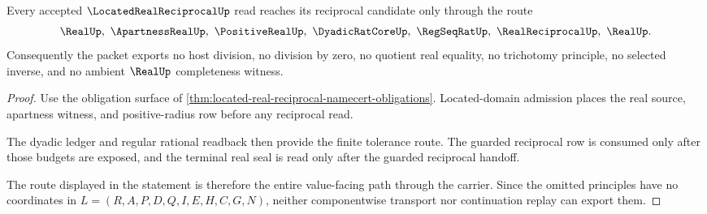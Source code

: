 \begin{theorem}
\label{thm:located-real-reciprocal-nonescape}
Every accepted $\LocatedRealReciprocalUp$ read reaches its reciprocal candidate only through the route
$$
\RealUp,\ \ApartnessRealUp,\ \PositiveRealUp,\ \DyadicRatCoreUp,\ \RegSeqRatUp,\ \RealReciprocalUp,\ \RealUp .
$$
Consequently the packet exports no host division, no division by zero, no quotient real equality, no trichotomy principle, no selected inverse, and no ambient $\RealUp$ completeness witness.
\end{theorem}
\begin{proof}
Use the obligation surface of \autoref{thm:located-real-reciprocal-namecert-obligations}. Located-domain admission places the real source, apartness witness, and positive-radius row before any reciprocal read.

The dyadic ledger and regular rational readback then provide the finite tolerance route. The guarded reciprocal row is consumed only after those budgets are exposed, and the terminal real seal is read only after the guarded reciprocal handoff.

The route displayed in the statement is therefore the entire value-facing path through the carrier. Since the omitted principles have no coordinates in $L=(R,A,P,D,Q,I,E,H,C,G,N)$, neither componentwise transport nor continuation replay can export them.
\end{proof}

\begin{closurestatus}{\LocatedRealReciprocalUp}
  \theoryclosure{\seedClosure}
  \formalstatus{\unformalizedV}
\end{closurestatus}
